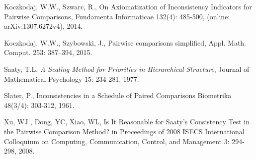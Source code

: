 \documentclass [12pt]{article}
\theoremstyle{definition}
\begin{document}
\begin{thebibliography}{9}
Koczkodaj, W.W., Szwarc, R., On Axiomatization of Inconsistency Indicators for Pairwise Comparisons, Fundamenta Informaticae 132(4): 485-500,  (online: arXiv:1307.6272v4), 2014.

Koczkodaj, W.W., Szybowski, J., Pairwise comparisons simplified, Appl. Math. Comput. 253: 387--394, 2015.




Saaty, T.L. {\it A Scaling Method for Priorities in Hierarchical Structure}, Journal of Mathematical Psychology 15: 234-281, 1977.

Slater, P., Inconsistencies in a Schedule of Paired Comparisons
Biometrika 48(3/4): 303-312,  1961.

Xu, WJ , Dong, YC, Xiao, WL, Is It Reasonable for Saaty's Consistency
Test in the Pairwise Comparison Method? in Proceedings of 2008 ISECS
International Colloquium on Computing, Communication, Control, and
Management 3: 294-298, 2008.



\end{thebibliography}
\end{document}
